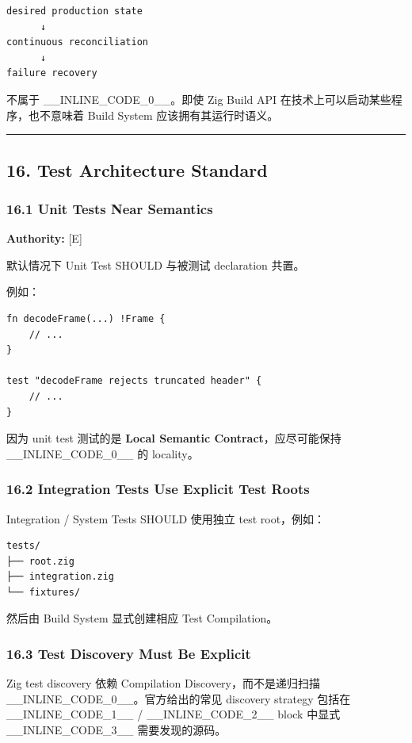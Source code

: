 \documentclass[11pt,a4paper]{article}
\begin{document}
\begin{lstlisting}[language=text]
desired production state
      ↓
continuous reconciliation
      ↓
failure recovery
\end{lstlisting}
不属于 \_\_INLINE\_CODE\_0\_\_。即使 Zig Build API 在技术上可以启动某些程序，也不意味着 Build System 应该拥有其运行时语义。

\vspace{0.5em}\hrule\vspace{0.5em}
\subsection{16. Test Architecture Standard}
\subsubsection{16.1 Unit Tests Near Semantics}
\textbf{Authority:} [E]

默认情况下 Unit Test SHOULD 与被测试 declaration 共置。

例如：

\begin{lstlisting}[language=zig]
fn decodeFrame(...) !Frame {
    // ...
}

test "decodeFrame rejects truncated header" {
    // ...
}
\end{lstlisting}
因为 unit test 测试的是 \textbf{Local Semantic Contract}，应尽可能保持 \_\_INLINE\_CODE\_0\_\_ 的 locality。

\subsubsection{16.2 Integration Tests Use Explicit Test Roots}
Integration / System Tests SHOULD 使用独立 test root，例如：

\begin{lstlisting}[language=text]
tests/
├── root.zig
├── integration.zig
└── fixtures/
\end{lstlisting}
然后由 Build System 显式创建相应 Test Compilation。

\subsubsection{16.3 Test Discovery Must Be Explicit}
Zig test discovery 依赖 Compilation Discovery，而不是递归扫描 \_\_INLINE\_CODE\_0\_\_。官方给出的常见 discovery strategy 包括在 \_\_INLINE\_CODE\_1\_\_ / \_\_INLINE\_CODE\_2\_\_ block 中显式 \_\_INLINE\_CODE\_3\_\_ 需要发现的源码。
\end{document}
